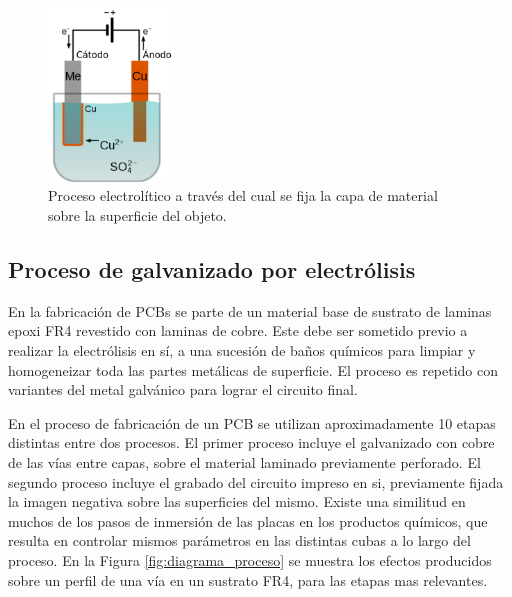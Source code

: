 \begin{figure}[h]
	\centering
	\includegraphics[width=0.3\textwidth]{Figures/Cap_2/galvanizado_copper_electroplating}
	\caption{Proceso electrolítico a través del cual se fija la capa de material sobre la superficie del objeto.}
	\label{fig:copper_electroplating}
\end{figure}


\subsection{ Proceso de galvanizado por electrólisis }

En la fabricación de PCBs se parte de un material base de sustrato de laminas epoxi FR4 revestido con laminas de cobre. Este debe ser sometido previo a realizar la electrólisis en sí, a una sucesión de baños químicos para limpiar y homogeneizar toda las partes metálicas de superficie. El proceso es repetido con variantes del metal galvánico para lograr el circuito final. 

En el proceso de fabricación de un PCB se utilizan aproximadamente 10 etapas distintas entre dos procesos. El primer proceso incluye el galvanizado con cobre de las vías entre capas, sobre el material laminado previamente perforado. El segundo proceso incluye el grabado del circuito impreso en si, previamente fijada la imagen negativa sobre las superficies del mismo.
Existe una similitud en muchos de los pasos de inmersión de las placas en los productos químicos, que resulta en controlar mismos parámetros en las distintas cubas a lo largo del proceso. 
En la Figura \ref{fig:diagrama_proceso} se muestra los efectos producidos sobre un perfil de una vía en un sustrato FR4, para las etapas mas relevantes.

